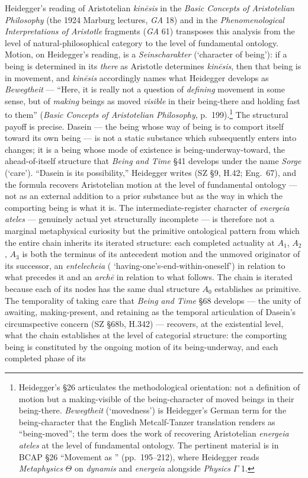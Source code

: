 Heidegger's reading of Aristotelian \textit{kinēsis} in the \textit{Basic Concepts of Aristotelian Philosophy} (the 1924 Marburg lectures, \textit{GA} 18) and in the \textit{Phenomenological Interpretations of Aristotle} fragments (\textit{GA} 61) transposes this analysis from the level of natural-philosophical category to the level of fundamental ontology. Motion, on Heidegger's reading, is a \textit{Seinscharakter} (`character of being'): if a being is determined in its \textit{there} as Aristotle determines \textit{kinēsis}, then that being is in movement, and \textit{kinēsis} accordingly names what Heidegger develops as \textit{Bewegtheit} --- ``Here, it is really not a question of \textit{defining} movement in some sense, but of \textit{making} beings as moved \textit{visible} in their being-there and holding fast to them'' (\textit{Basic Concepts of Aristotelian Philosophy}, p.~199).\footnote{Heidegger's \S 26 articulates the methodological orientation: not a definition of motion but a making-visible of the being-character of moved beings in their being-there. \textit{Bewegtheit} (`movedness') is Heidegger's German term for the being-character that the English Metcalf-Tanzer translation renders as ``being-moved''; the term does the work of recovering Aristotelian \textit{energeia ateles} at the level of fundamental ontology. The pertinent material is in BCAP \S 26 ``Movement as '' (pp.~195--212), where Heidegger reads \textit{Metaphysics} $\Theta$ on \textit{dynamis} and \textit{energeia} alongside \textit{Physics} $\Gamma$ 1.} The structural payoff is precise. Dasein --- the being whose way of being is to comport itself toward its own being --- is not a static substance which subsequently enters into changes; it is a being whose mode of existence is being-underway-toward, the ahead-of-itself structure that \textit{Being and Time} \S 41 develops under the name \textit{Sorge} (`care'). ``Dasein is its possibility,'' Heidegger writes (SZ \S 9, H.42; Eng.~67), and the formula recovers Aristotelian motion at the level of fundamental ontology --- not as an external addition to a prior substance but as the way in which the comporting being is what it is. The intermediate-register character of \textit{energeia ateles} --- genuinely actual yet structurally incomplete --- is therefore not a marginal metaphysical curiosity but the primitive ontological pattern from which the entire chain inherits its iterated structure: each completed actuality at $A_1$, $A_2$, $A_3$ is both the terminus of its antecedent motion and the unmoved originator of its successor, an \textit{entelecheia} ( `having-one's-end-within-oneself') in relation to what precedes it and an \textit{archē} in relation to what follows. The chain is iterated because each of its nodes has the same dual structure $A_0$ establishes as primitive. The temporality of taking care that \textit{Being and Time} \S 68 develops --- the unity of awaiting, making-present, and retaining as the temporal articulation of Dasein's circumspective concern (SZ \S 68b, H.342) --- recovers, at the existential level, what the chain establishes at the level of categorial structure: the comporting being is constituted by the ongoing motion of its being-underway, and each completed phase of its 